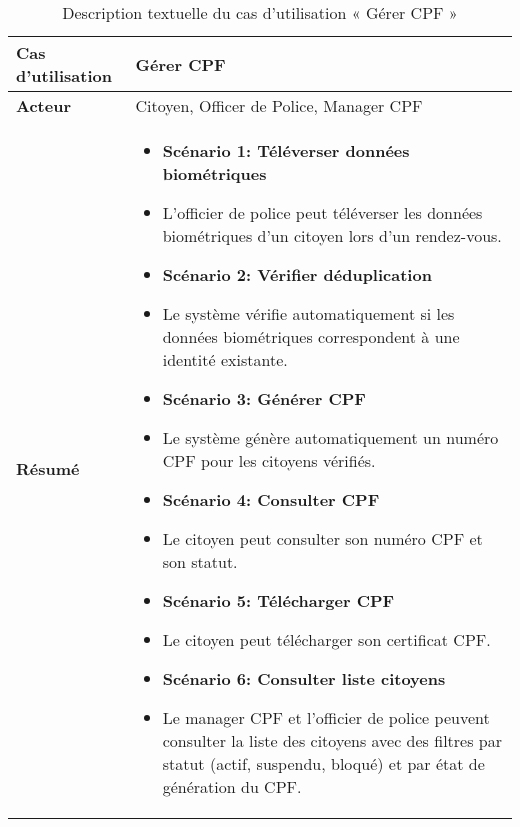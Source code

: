 \begin{longtable}{|>{\arraybackslash}p{4.2cm}|>{\arraybackslash}p{12.5cm}|}
\caption{\centering Description textuelle du cas d'utilisation « Gérer CPF »}
\label{tab:backlog} \\
\hline
\textbf{Cas d'utilisation} & Gérer CPF \\
\hline
\endfirsthead

\hline
\endhead

\hline
\endfoot

\hline \hline
\endlastfoot
 \textbf{Acteur}  & Citoyen, Officer de Police, Manager CPF\\
\hline
\textbf{Résumé} &
\begin{itemize}[label=]
  \item\textbf{Scénario 1: Téléverser données biométriques}
  \item L'officier de police peut téléverser les données biométriques d'un citoyen lors d'un rendez-vous.
  \item\textbf{Scénario 2: Vérifier déduplication}
  \item Le système vérifie automatiquement si les données biométriques correspondent à une identité existante.
  \item\textbf{Scénario 3: Générer CPF}
  \item Le système génère automatiquement un numéro CPF pour les citoyens vérifiés.
  \item\textbf{Scénario 4: Consulter CPF}
  \item Le citoyen peut consulter son numéro CPF et son statut.
  \item\textbf{Scénario 5: Télécharger CPF}
  \item Le citoyen peut télécharger son certificat CPF.
  \item\textbf{Scénario 6: Consulter liste citoyens}
  \item Le manager CPF et l'officier de police peuvent consulter la liste des citoyens avec des filtres par statut (actif, suspendu, bloqué) et par état de génération du CPF.
\end{itemize}\\


\end{longtable}

